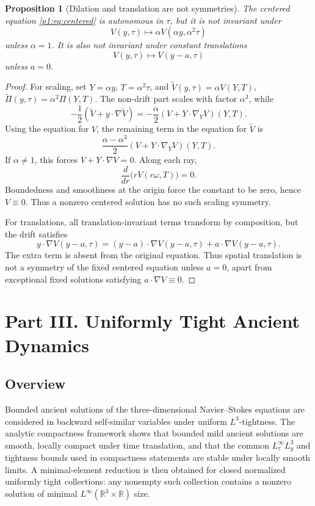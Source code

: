 \documentclass[11pt]{amsart}
\theoremstyle{plain}
\newtheorem{proposition}[proposition]{Proposition}
\theoremstyle{definition}
\theoremstyle{remark}
\numberwithin{equation}{section}
\newcommand{\R}{\mathbb R}
\begin{document}
\begin{proposition}[Dilation and translation are not symmetries]
\label{p1:prop:no-cascade}
The centered equation \eqref{p1:eq:centered} is autonomous in \(\tau\), but it is
not invariant under
\[
   V(y,\tau)\mapsto \alpha V(\alpha y,\alpha^2\tau)
\]
unless \(\alpha=1\).  It is also not invariant under constant translations
\[
   V(y,\tau)\mapsto V(y-a,\tau)
\]
unless \(a=0\).
\end{proposition}

\begin{proof}
For scaling, set \(Y=\alpha y\), \(T=\alpha^2\tau\), and
\(\widetilde V(y,\tau)=\alpha V(Y,T)\),
\(\widetilde\Pi(y,\tau)=\alpha^2\Pi(Y,T)\).  The non-drift part scales with
factor \(\alpha^3\), while
\[
   -\frac12(\widetilde V+y\cdot\nabla\widetilde V)
   =
   -\frac{\alpha}{2}(V+Y\cdot\nabla_YV)(Y,T).
\]
Using the equation for \(V\), the remaining term in the equation for \(\widetilde V\) is
\[
   \frac{\alpha-\alpha^3}{2}(V+Y\cdot\nabla_YV)(Y,T).
\]
If \(\alpha\ne1\), this forces \(V+Y\cdot\nabla V=0\).  Along each ray,
\[
   \frac{d}{dr}\bigl(rV(r\omega,T)\bigr)=0.
\]
Boundedness and smoothness at the origin force the constant to be zero, hence
\(V\equiv0\).  Thus a nonzero centered solution has no such scaling symmetry.

For translations, all translation-invariant terms transform by composition,
but the drift satisfies
\[
   y\cdot\nabla V(y-a,\tau)
   =
   (y-a)\cdot\nabla V(y-a,\tau)+a\cdot\nabla V(y-a,\tau).
\]
The extra term is absent from the original equation.  Thus spatial
translation is not a symmetry of the fixed centered equation unless \(a=0\),
apart from exceptional fixed solutions satisfying \(a\cdot\nabla V\equiv0\).
\end{proof}



\clearpage
\section*{Part III. Uniformly Tight Ancient Dynamics}

\subsection*{Overview}

Bounded ancient solutions of the three-dimensional Navier--Stokes equations
are considered in backward self-similar variables under uniform
\(L^3\)-tightness.  The analytic compactness framework shows that bounded mild
ancient solutions are smooth, locally compact under time translation, and that
the common \(L^\infty_\tau L^3_y\) and tightness bounds used in compactness
statements are stable under locally smooth limits.  A minimal-element reduction
is then obtained for closed normalized uniformly tight collections:
any nonempty such collection contains a nonzero solution of minimal
\(L^\infty(\R^3\times\R)\) size.
\end{document}
